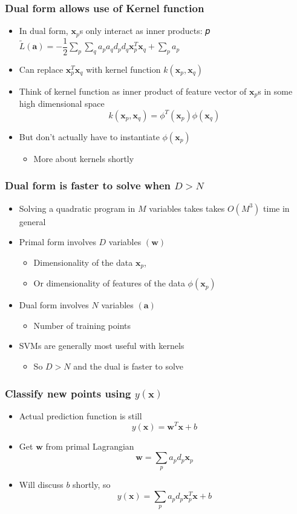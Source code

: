 \documentclass[12pt,notes,mathserif]{beamer}
\begin{document}
\begin{frame}[c]
\frametitle{Dual form allows use of Kernel function}
\begin{itemize}
\item In dual form, $\bm{x}_p$s only interact as inner products:
𝑝
$\tilde{L}(\bm{a})=-\dfrac{1}{2}\sum\limits_p\sum\limits_qa_pa_qd_pd_q\bm{x}_p^T\bm{x}_q+\sum\limits_pa_p$
\item Can replace $\bm{x}_p^T\bm{x}_q$ with kernel function $k(\bm{x}_p,\bm{x}_q)$
\item Think of kernel function as inner product of feature vector of $\bm{x}_p$s in some high dimensional space
\[
k(\bm{x}_p,\bm{x}_q)=\phi^T(\bm{x}_p)\phi(\bm{x}_q)
\]
\item But don't actually have to instantiate $\phi(\bm{x}_p)$
\begin{itemize}
\item More about kernels shortly
\end{itemize}
\end{itemize}
\end{frame}



\begin{frame}[c]
\frametitle{Dual form is faster to solve when $D>N$}
\begin{itemize}
\item Solving a quadratic program in $M$ variables takes takes $O(M^3)$ time in general
\item Primal form involves $D$ variables $(\bm{w})$
\begin{itemize}
\item Dimensionality of the data $\bm{x}_p$,
\item Or dimensionality of features of the data $\phi(\bm{x}_p)$
\end{itemize}
\item Dual form involves $N$ variables $(\bm{a})$
\begin{itemize}
\item Number of training points
\end{itemize}
\item SVMs are generally most useful with kernels
\begin{itemize}
\item So $D>N$ and the dual is faster to solve
\end{itemize}
\end{itemize}
\end{frame}


\begin{frame}[c]
\frametitle{Classify new points using $y(\bm{x})$}
\begin{itemize}
\item Actual prediction function is still
\[
y(\bm{x})=\bm{w}^T\bm{x}+b
\]
\item Get $\bm{w}$ from primal Lagrangian
\[
\bm{w}=\sum_pa_pd_p\bm{x}_p
\]
\item Will discuss $b$ shortly, so
\[
y(\bm{x})=\sum_pa_pd_p\bm{x}_p^T\bm{x}+b
\]
\end{itemize}
\end{frame}
\end{document}
